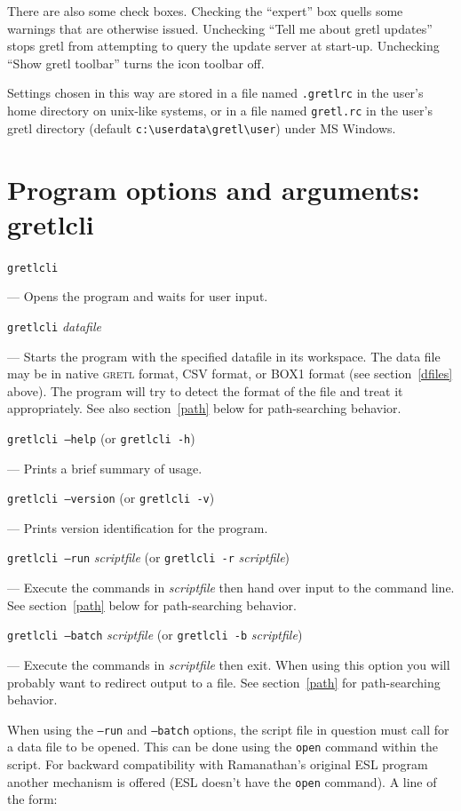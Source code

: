 \documentclass{article}
\begin{document}
{There are also some check boxes.  Checking the ``expert'' box quells
some warnings that are otherwise issued.  Unchecking ``Tell me about
gretl updates'' stops \textsf{gretl} from attempting to query the
update server at start-up.  Unchecking ``Show gretl toolbar'' turns
the icon toolbar off.

Settings chosen in this way are stored in a file named
\texttt{.gretlrc} in the user's home directory on unix-like systems,
or in a file named \texttt{gretl.rc} in the user's gretl directory
(default \verb+c:\userdata\gretl\user+) under MS Windows.

\section{Program options and arguments: gretlcli}
\label{optarg2}

\texttt{gretlcli}  

--- Opens the program and waits for user input.

\texttt{gretlcli} \textit{datafile}  

--- Starts the program with the specified datafile in its workspace.
The data file may be in native \textsc{gretl} format, CSV format, or
BOX1 format (see section~\ref{dfiles} above).  The program will try to
detect the format of the file and treat it appropriately.  See also
section~\ref{path} below for path-searching behavior.

\texttt{gretlcli --help} (or \texttt{gretlcli -h})

--- Prints a brief summary of usage.

\texttt{gretlcli --version} (or \texttt{gretlcli -v})

--- Prints version identification for the program.

\texttt{gretlcli --run} \textit{scriptfile} (or \texttt{gretlcli -r}
\textit{scriptfile})

--- Execute the commands in \textit{scriptfile} then hand over input
to the command line.  See section~\ref{path} below for
path-searching behavior.  

\texttt{gretlcli --batch} \textit{scriptfile} (or \texttt{gretlcli
  -b} \textit{scriptfile})

--- Execute the commands in \textit{scriptfile} then exit.  When using
this option you will probably want to redirect output to a file.  See
section~\ref{path} for path-searching behavior.

When using the \texttt{--run} and \texttt{--batch} options, the script
file in question must call for a data file to be opened.  This can be
done using the \texttt{open} command within the script.  For backward
compatibility with Ramanathan's original ESL program another mechanism
is offered (ESL doesn't have the \texttt{open} command).  A line of
the form:

}
\end{document}
